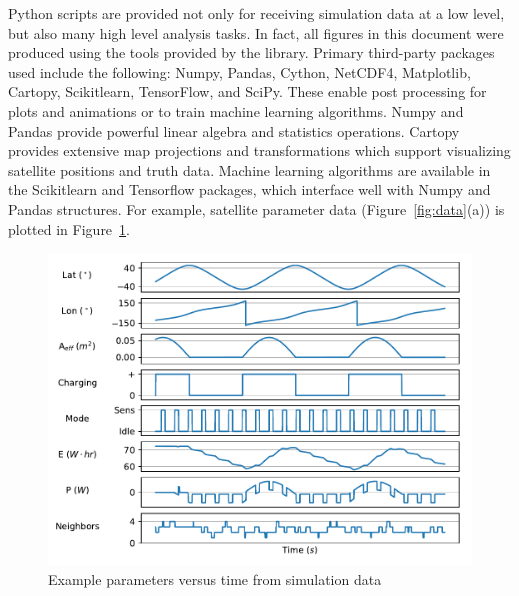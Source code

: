 \documentclass[conference]{IEEEtran}
\begin{document}
Python scripts are provided not only for receiving simulation data at a low level, but also many high level analysis tasks.  In fact, all figures in this document were produced using the tools provided by the library.  Primary third-party packages used include the following: Numpy, Pandas, Cython, NetCDF4, Matplotlib, Cartopy, Scikitlearn, TensorFlow, and SciPy.  These enable post processing for plots and animations or to train machine learning algorithms.  Numpy and Pandas provide powerful linear algebra and statistics operations.  Cartopy provides extensive map projections and transformations which support visualizing satellite positions and truth data.  Machine learning algorithms are available in the Scikitlearn and Tensorflow packages, which interface well with Numpy and Pandas structures.
%
For example, satellite parameter data (Figure~\ref{fig:data}(a)) is plotted in Figure~\ref{fig:processing}. %

\begin{figure}[t]
  \begin{center}
    \includegraphics[width=0.9\linewidth]{images/param_plot.pdf}
  \caption{Example parameters versus time from simulation data}
  \end{center}
  \label{fig:processing}
\end{figure}
\end{document}
